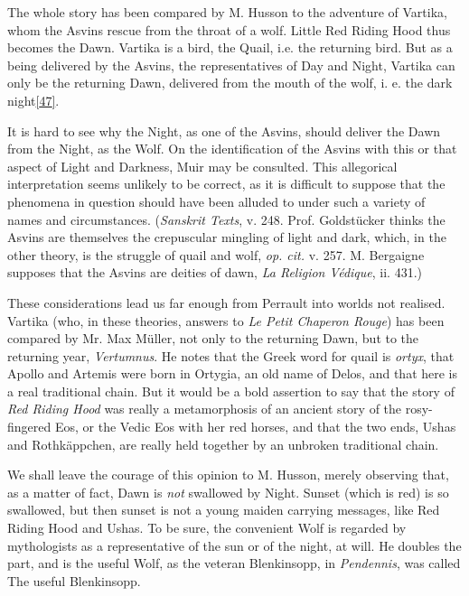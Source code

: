 \documentclass[14pt,a4paper]{memoir}
\begin{document}
The whole story has been compared by M. Husson to the adventure of
Vartika, whom the Asvins rescue from the throat of a wolf. Little Red
Riding Hood thus becomes the Dawn. Vartika is a bird, the Quail,
\textquotesingle i.e. the returning bird. But as a being delivered by
the Asvins, the representatives of Day and Night, Vartika can only be
the returning Dawn, delivered from the mouth of the wolf, i. e. the dark
night\protect\hypertarget{4533318093929944247_33931-h-0.htm.xhtmlux5cux23FNanchor_47}{}{}\protect\hyperlink{4533318093929944247_33931-h-0.htm.xhtmlux5cux23Footnote_47}{{[}47{]}}.\textquotesingle{}

It is hard to see why the Night, as one of the Asvins, should deliver
the Dawn from the Night, as the Wolf. On the identification of the
Asvins with this or that aspect of Light and Darkness, Muir may be
consulted. \textquotesingle This allegorical interpretation seems
unlikely to be correct, as it is difficult to suppose that the phenomena
in question should have been alluded to under such a variety of names
and circumstances.\textquotesingle{} (\emph{Sanskrit Texts}, v. 248.
Prof. Goldstücker thinks the Asvins are themselves the crepuscular
mingling of light and dark, which, in the other theory, is the struggle
of quail and wolf, \emph{op. cit.} v. 257. M. Bergaigne supposes that
the Asvins are deities of dawn, \emph{La Religion Védique}, ii. 431.)

These considerations lead us far enough from Perrault into
\textquotesingle worlds not realised.\textquotesingle{} Vartika (who, in
these theories, answers to \emph{Le Petit Chaperon Rouge}) has been
compared by Mr. Max Müller, not only to the returning Dawn, but to the
returning year, \emph{Vertumnus}. He notes that the Greek word for quail
is \emph{ortyx}, that Apollo and Artemis were born in Ortygia, an old
name of Delos, and that \textquotesingle here is a real traditional
chain.\textquotesingle{} But \textquotesingle it would be a bold
assertion to say that the story of \emph{Red Riding Hood} was really a
metamorphosis of an ancient story of the rosy-fingered Eos, or the Vedic
Eos with her red horses, and that the two ends, Ushas and Rothkäppchen,
are really held together by an unbroken traditional
chain.\textquotesingle{}

We shall leave the courage of this opinion to M. Husson, merely
observing that, as a matter of fact, Dawn is \emph{not} swallowed by
Night. Sunset (which is red) is so swallowed, but then sunset is not
\textquotesingle a young maiden carrying messages,\textquotesingle{}
like Red Riding Hood and Ushas. To be sure, the convenient Wolf is
regarded by mythologists as \textquotesingle a representative of the sun
or of the night,\textquotesingle{} at will. He \textquotesingle doubles
the part,\textquotesingle{} and \textquotesingle is the useful
Wolf,\textquotesingle{} as the veteran Blenkinsopp, in \emph{Pendennis},
was called \textquotesingle The useful Blenkinsopp.\textquotesingle{}
\end{document}
